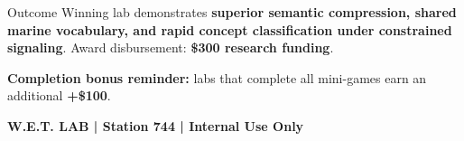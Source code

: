 \documentclass[10pt]{article}
\begin{document}
\vspace{6pt}

\begin{labbox}{Outcome}
Winning lab demonstrates \textbf{superior semantic compression, shared marine vocabulary, and rapid concept classification under constrained signaling}. Award disbursement: \textbf{\$300 research funding}.

\vspace{3pt}
\textbf{Completion bonus reminder:} labs that complete all mini-games earn an additional \textbf{+\$100}.
\end{labbox}

\vfill
\begin{center}
\footnotesize\color{agencyblue}\textbf{W.E.T. LAB | Station 744 | Internal Use Only}
\end{center}
\end{document}
